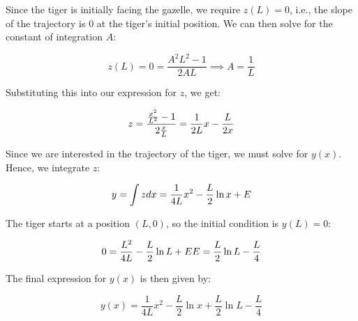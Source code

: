 \begin{enumerate}
	        Since the tiger is initially facing the gazelle, we require $z(L)=0$, i.e., the slope of the trajectory is 0 at the tiger's initial position. We can then solve for the constant of integration $A$:
	        
	        \[
	            z(L) = 0 = \frac{A^2L^2-1}{2AL} \implies A=\frac{1}{L}
	        \]
	        
	        Substituting this into our expression for $z$, we get:
	        
	        \[
	            z = \frac{\frac{x^2}{L^2} - 1}{2\frac{x}{L}}\\
	            = \frac{1}{2L}x - \frac{L}{2x}
	        \]
	        
	        Since we are interested in the trajectory of the tiger, we must solve for $y(x)$. Hence, we integrate $z$:
	        
	        \[
	            y = \int zdx\\
	            = \frac{1}{4L}x^2 - \frac{L}{2}\ln{x} + E
	        \]
	        
	        The tiger starts at a position $(L, 0)$, so the initial condition is $y(L) = 0$:
	        
	        \[
	            0 = \frac{L^2}{4L} - \frac{L}{2}\ln{L} + E\\
	            E = \frac{L}{2}\ln{L} - \frac{L}{4}
	        \]
	        
	        The final expression for $y(x)$ is then given by:
	        
	        \[
	            y(x) = \frac{1}{4L}x^2 - \frac{L}{2}\ln{x} + \frac{L}{2}\ln{L} - \frac{L}{4}
	        \]
\end{enumerate}